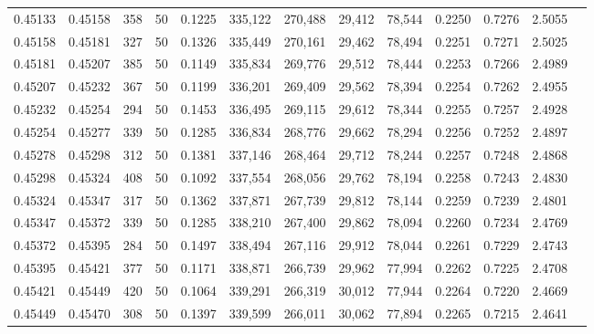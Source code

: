 \begin{tabular}{rrrrrrrrrrrrr}
0.45133 & 0.45158 &   358 &  50 &                                     0.1225 & 335,122 & 270,488 &  29,412 &  78,544 & 0.2250 & 0.7276 & 2.5055 \\
0.45158 & 0.45181 &   327 &  50 &                                     0.1326 & 335,449 & 270,161 &  29,462 &  78,494 & 0.2251 & 0.7271 & 2.5025 \\
0.45181 & 0.45207 &   385 &  50 &                                     0.1149 & 335,834 & 269,776 &  29,512 &  78,444 & 0.2253 & 0.7266 & 2.4989 \\
0.45207 & 0.45232 &   367 &  50 &                                     0.1199 & 336,201 & 269,409 &  29,562 &  78,394 & 0.2254 & 0.7262 & 2.4955 \\
0.45232 & 0.45254 &   294 &  50 &                                     0.1453 & 336,495 & 269,115 &  29,612 &  78,344 & 0.2255 & 0.7257 & 2.4928 \\
0.45254 & 0.45277 &   339 &  50 &                                     0.1285 & 336,834 & 268,776 &  29,662 &  78,294 & 0.2256 & 0.7252 & 2.4897 \\
0.45278 & 0.45298 &   312 &  50 &                                     0.1381 & 337,146 & 268,464 &  29,712 &  78,244 & 0.2257 & 0.7248 & 2.4868 \\
0.45298 & 0.45324 &   408 &  50 &                                     0.1092 & 337,554 & 268,056 &  29,762 &  78,194 & 0.2258 & 0.7243 & 2.4830 \\
0.45324 & 0.45347 &   317 &  50 &                                     0.1362 & 337,871 & 267,739 &  29,812 &  78,144 & 0.2259 & 0.7239 & 2.4801 \\
0.45347 & 0.45372 &   339 &  50 &                                     0.1285 & 338,210 & 267,400 &  29,862 &  78,094 & 0.2260 & 0.7234 & 2.4769 \\
0.45372 & 0.45395 &   284 &  50 &                                     0.1497 & 338,494 & 267,116 &  29,912 &  78,044 & 0.2261 & 0.7229 & 2.4743 \\
0.45395 & 0.45421 &   377 &  50 &                                     0.1171 & 338,871 & 266,739 &  29,962 &  77,994 & 0.2262 & 0.7225 & 2.4708 \\
0.45421 & 0.45449 &   420 &  50 &                                     0.1064 & 339,291 & 266,319 &  30,012 &  77,944 & 0.2264 & 0.7220 & 2.4669 \\
0.45449 & 0.45470 &   308 &  50 &                                     0.1397 & 339,599 & 266,011 &  30,062 &  77,894 & 0.2265 & 0.7215 & 2.4641 \\

\end{tabular}
